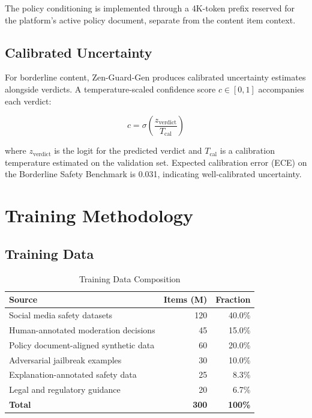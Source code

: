 \documentclass[11pt,a4paper]{article}
\begin{document}
The policy conditioning is implemented through a 4K-token prefix reserved for the platform's active policy document, separate from the content item context.

\subsection{Calibrated Uncertainty}

For borderline content, Zen-Guard-Gen produces calibrated uncertainty estimates alongside verdicts. A temperature-scaled confidence score $c \in [0,1]$ accompanies each verdict:

\begin{equation}
  c = \sigma\left(\frac{z_{\text{verdict}}}{T_{\text{cal}}}\right)
\end{equation}

where $z_{\text{verdict}}$ is the logit for the predicted verdict and $T_{\text{cal}}$ is a calibration temperature estimated on the validation set. Expected calibration error (ECE) on the Borderline Safety Benchmark is 0.031, indicating well-calibrated uncertainty.

\section{Training Methodology}

\subsection{Training Data}

\begin{table}[H]
\centering
\caption{Training Data Composition}
\begin{tabular}{lrr}
\toprule
\textbf{Source} & \textbf{Items (M)} & \textbf{Fraction} \\
\midrule
Social media safety datasets & 120 & 40.0\% \\
Human-annotated moderation decisions & 45 & 15.0\% \\
Policy document-aligned synthetic data & 60 & 20.0\% \\
Adversarial jailbreak examples & 30 & 10.0\% \\
Explanation-annotated safety data & 25 & 8.3\% \\
Legal and regulatory guidance & 20 & 6.7\% \\
\midrule
\textbf{Total} & \textbf{300} & \textbf{100\%} \\
\bottomrule
\end{tabular}
\end{table}
\end{document}
